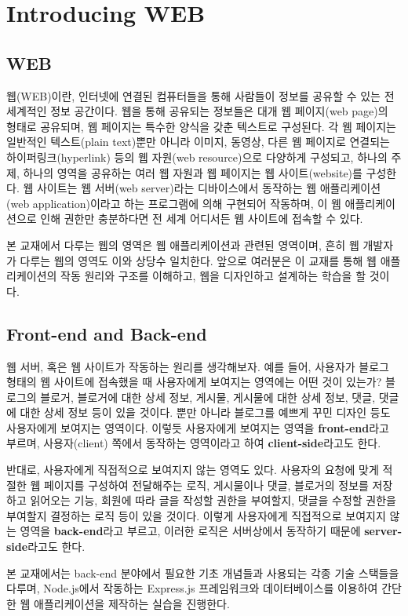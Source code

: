 \section{Introducing WEB}\label{sect:introducing-web}

\subsection*{WEB}

웹(WEB)이란, 인터넷에 연결된 컴퓨터들을 통해 사람들이 정보를 공유할 수 있는 전 세계적인 정보 공간이다. 웹을 통해 공유되는 정보들은 대개 웹 페이지(web page)의 형태로 공유되며, 웹 페이지는 특수한 양식을 갖춘 텍스트로 구성된다. 각 웹 페이지는 일반적인 텍스트(plain text)뿐만 아니라 이미지, 동영상, 다른 웹 페이지로 연결되는 하이퍼링크(hyperlink) 등의 웹 자원(web resource)으로 다양하게 구성되고, 하나의 주제, 하나의 영역을 공유하는 여러 웹 자원과 웹 페이지는 웹 사이트(website)를 구성한다. 웹 사이트는 웹 서버(web server)라는 디바이스에서 동작하는 웹 애플리케이션(web application)이라고 하는 프로그램에 의해 구현되어 작동하며, 이 웹 애플리케이션으로 인해 권한만 충분하다면 전 세계 어디서든 웹 사이트에 접속할 수 있다.

본 교재에서 다루는 웹의 영역은 웹 애플리케이션과 관련된 영역이며, 흔히 웹 개발자가 다루는 웹의 영역도 이와 상당수 일치한다. 앞으로 여러분은 이 교재를 통해 웹 애플리케이션의 작동 원리와 구조를 이해하고, 웹을 디자인하고 설계하는 학습을 할 것이다.

\subsection*{Front-end and Back-end}

웹 서버, 혹은 웹 사이트가 작동하는 원리를 생각해보자. 예를 들어, 사용자가 블로그 형태의 웹 사이트에 접속했을 때 사용자에게 보여지는 영역에는 어떤 것이 있는가? 블로그의 블로거, 블로거에 대한 상세 정보, 게시물, 게시물에 대한 상세 정보, 댓글, 댓글에 대한 상세 정보 등이 있을 것이다. 뿐만 아니라 블로그를 예쁘게 꾸민 디자인 등도 사용자에게 보여지는 영역이다. 이렇듯 사용자에게 보여지는 영역을 \textbf{front-end}라고 부르며, 사용자(client) 쪽에서 동작하는 영역이라고 하여 \textbf{client-side}라고도 한다.

반대로, 사용자에게 직접적으로 보여지지 않는 영역도 있다. 사용자의 요청에 맞게 적절한 웹 페이지를 구성하여 전달해주는 로직, 게시물이나 댓글, 블로거의 정보를 저장하고 읽어오는 기능, 회원에 따라 글을 작성할 권한을 부여할지, 댓글을 수정할 권한을 부여할지 결정하는 로직 등이 있을 것이다. 이렇게 사용자에게 직접적으로 보여지지 않는 영역을 \textbf{back-end}라고 부르고, 이러한 로직은 서버상에서 동작하기 때문에 \textbf{server-side}라고도 한다.


본 교재에서는 back-end 분야에서 필요한 기초 개념들과 사용되는 각종 기술 스택들을 다루며, Node.js에서 작동하는 Express.js 프레임워크와 데이터베이스를 이용하여 간단한 웹 애플리케이션을 제작하는 실습을 진행한다.
